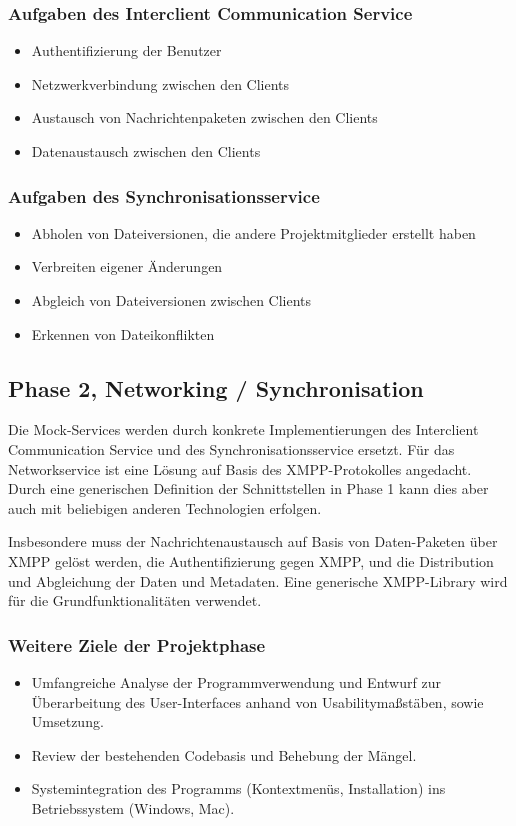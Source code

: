 \subsubsection{Aufgaben des Interclient Communication Service}
\begin{itemize}
\item Authentifizierung der Benutzer
\item Netzwerkverbindung zwischen den Clients
\item Austausch von Nachrichtenpaketen zwischen den Clients
\item Datenaustausch zwischen den Clients
\end{itemize}
\subsubsection{Aufgaben des Synchronisationsservice}
\begin{itemize}
\item Abholen von Dateiversionen, die andere Projektmitglieder erstellt haben
\item Verbreiten eigener Änderungen
\item Abgleich von Dateiversionen zwischen Clients
\item Erkennen von Dateikonflikten
\end{itemize}
\subsection{Phase 2, Networking / Synchronisation}
Die Mock-Services werden durch konkrete Implementierungen des Interclient Communication Service und des Synchronisationsservice ersetzt. Für das Networkservice ist eine Lösung auf Basis des XMPP-Protokolles angedacht. Durch eine generischen Definition der Schnittstellen in Phase 1 kann dies aber auch mit beliebigen anderen Technologien erfolgen.


Insbesondere muss der Nachrichtenaustausch auf Basis von Daten-Paketen über XMPP gelöst werden, die Authentifizierung gegen XMPP, und die Distribution und Abgleichung der Daten und Metadaten. 
Eine generische XMPP-Library wird für die Grundfunktionalitäten verwendet.

\subsubsection{Weitere Ziele der Projektphase}
\begin{itemize}
\item Umfangreiche Analyse der Programmverwendung und Entwurf zur Überarbeitung des User-Interfaces anhand von Usabilitymaßstäben, sowie Umsetzung.
\item Review der bestehenden Codebasis und Behebung der Mängel.
\item Systemintegration des Programms (Kontextmenüs, Installation) ins Betriebssystem (Windows, Mac).
\end{itemize}

